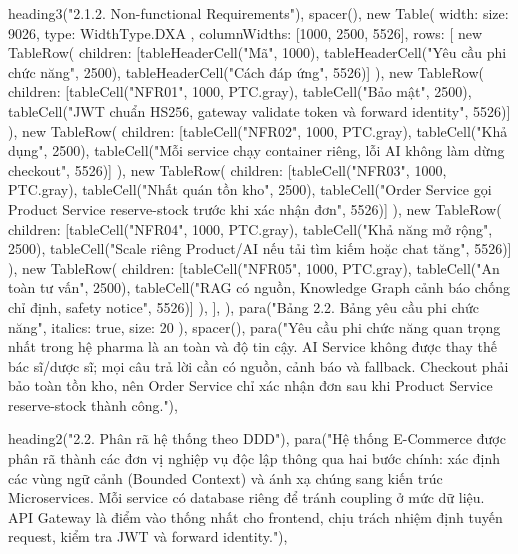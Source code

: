   heading3("2.1.2. Non-functional Requirements"),
  spacer(),
  new Table({
    width: { size: 9026, type: WidthType.DXA },
    columnWidths: [1000, 2500, 5526],
    rows: [
      new TableRow({ children: [tableHeaderCell("Mã", 1000), tableHeaderCell("Yêu cầu phi chức năng", 2500), tableHeaderCell("Cách đáp ứng", 5526)] }),
      new TableRow({ children: [tableCell("NFR01", 1000, PTC.gray), tableCell("Bảo mật", 2500), tableCell("JWT chuẩn HS256, gateway validate token và forward identity", 5526)] }),
      new TableRow({ children: [tableCell("NFR02", 1000, PTC.gray), tableCell("Khả dụng", 2500), tableCell("Mỗi service chạy container riêng, lỗi AI không làm dừng checkout", 5526)] }),
      new TableRow({ children: [tableCell("NFR03", 1000, PTC.gray), tableCell("Nhất quán tồn kho", 2500), tableCell("Order Service gọi Product Service reserve-stock trước khi xác nhận đơn", 5526)] }),
      new TableRow({ children: [tableCell("NFR04", 1000, PTC.gray), tableCell("Khả năng mở rộng", 2500), tableCell("Scale riêng Product/AI nếu tải tìm kiếm hoặc chat tăng", 5526)] }),
      new TableRow({ children: [tableCell("NFR05", 1000, PTC.gray), tableCell("An toàn tư vấn", 2500), tableCell("RAG có nguồn, Knowledge Graph cảnh báo chống chỉ định, safety notice", 5526)] }),
    ],
  }),
  para("Bảng 2.2. Bảng yêu cầu phi chức năng", { italics: true, size: 20 }),
  spacer(),
  para("Yêu cầu phi chức năng quan trọng nhất trong hệ pharma là an toàn và độ tin cậy. AI Service không được thay thế bác sĩ/dược sĩ; mọi câu trả lời cần có nguồn, cảnh báo và fallback. Checkout phải bảo toàn tồn kho, nên Order Service chỉ xác nhận đơn sau khi Product Service reserve-stock thành công."),

  heading2("2.2. Phân rã hệ thống theo DDD"),
  para("Hệ thống E-Commerce được phân rã thành các đơn vị nghiệp vụ độc lập thông qua hai bước chính: xác định các vùng ngữ cảnh (Bounded Context) và ánh xạ chúng sang kiến trúc Microservices. Mỗi service có database riêng để tránh coupling ở mức dữ liệu. API Gateway là điểm vào thống nhất cho frontend, chịu trách nhiệm định tuyến request, kiểm tra JWT và forward identity."),

